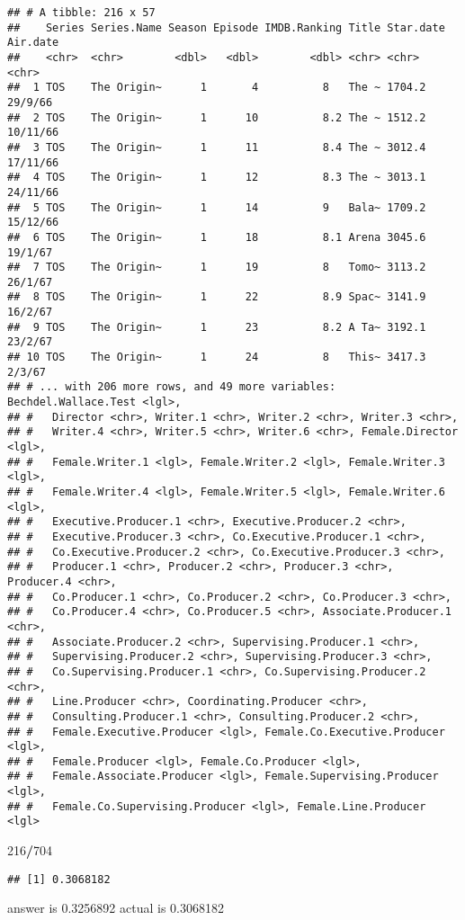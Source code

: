 \documentclass[
]{article}
\newenvironment{Shaded}{\begin{snugshade}}{\end{snugshade}}
\newcommand{\DecValTok}[1]{\textcolor[rgb]{0.00,0.00,0.81}{#1}}
\newcommand{\OperatorTok}[1]{\textcolor[rgb]{0.81,0.36,0.00}{\textbf{#1}}}
\begin{document}
\begin{verbatim}
## # A tibble: 216 x 57
##    Series Series.Name Season Episode IMDB.Ranking Title Star.date Air.date
##    <chr>  <chr>        <dbl>   <dbl>        <dbl> <chr> <chr>     <chr>   
##  1 TOS    The Origin~      1       4          8   The ~ 1704.2    29/9/66 
##  2 TOS    The Origin~      1      10          8.2 The ~ 1512.2    10/11/66
##  3 TOS    The Origin~      1      11          8.4 The ~ 3012.4    17/11/66
##  4 TOS    The Origin~      1      12          8.3 The ~ 3013.1    24/11/66
##  5 TOS    The Origin~      1      14          9   Bala~ 1709.2    15/12/66
##  6 TOS    The Origin~      1      18          8.1 Arena 3045.6    19/1/67 
##  7 TOS    The Origin~      1      19          8   Tomo~ 3113.2    26/1/67 
##  8 TOS    The Origin~      1      22          8.9 Spac~ 3141.9    16/2/67 
##  9 TOS    The Origin~      1      23          8.2 A Ta~ 3192.1    23/2/67 
## 10 TOS    The Origin~      1      24          8   This~ 3417.3    2/3/67  
## # ... with 206 more rows, and 49 more variables: Bechdel.Wallace.Test <lgl>,
## #   Director <chr>, Writer.1 <chr>, Writer.2 <chr>, Writer.3 <chr>,
## #   Writer.4 <chr>, Writer.5 <chr>, Writer.6 <chr>, Female.Director <lgl>,
## #   Female.Writer.1 <lgl>, Female.Writer.2 <lgl>, Female.Writer.3 <lgl>,
## #   Female.Writer.4 <lgl>, Female.Writer.5 <lgl>, Female.Writer.6 <lgl>,
## #   Executive.Producer.1 <chr>, Executive.Producer.2 <chr>,
## #   Executive.Producer.3 <chr>, Co.Executive.Producer.1 <chr>,
## #   Co.Executive.Producer.2 <chr>, Co.Executive.Producer.3 <chr>,
## #   Producer.1 <chr>, Producer.2 <chr>, Producer.3 <chr>, Producer.4 <chr>,
## #   Co.Producer.1 <chr>, Co.Producer.2 <chr>, Co.Producer.3 <chr>,
## #   Co.Producer.4 <chr>, Co.Producer.5 <chr>, Associate.Producer.1 <chr>,
## #   Associate.Producer.2 <chr>, Supervising.Producer.1 <chr>,
## #   Supervising.Producer.2 <chr>, Supervising.Producer.3 <chr>,
## #   Co.Supervising.Producer.1 <chr>, Co.Supervising.Producer.2 <chr>,
## #   Line.Producer <chr>, Coordinating.Producer <chr>,
## #   Consulting.Producer.1 <chr>, Consulting.Producer.2 <chr>,
## #   Female.Executive.Producer <lgl>, Female.Co.Executive.Producer <lgl>,
## #   Female.Producer <lgl>, Female.Co.Producer <lgl>,
## #   Female.Associate.Producer <lgl>, Female.Supervising.Producer <lgl>,
## #   Female.Co.Supervising.Producer <lgl>, Female.Line.Producer <lgl>
\end{verbatim}

\begin{Shaded}
\begin{Highlighting}[]
\DecValTok{216}\OperatorTok{/}\DecValTok{704}
\end{Highlighting}
\end{Shaded}

\begin{verbatim}
## [1] 0.3068182
\end{verbatim}

answer is 0.3256892 actual is 0.3068182
\end{document}
